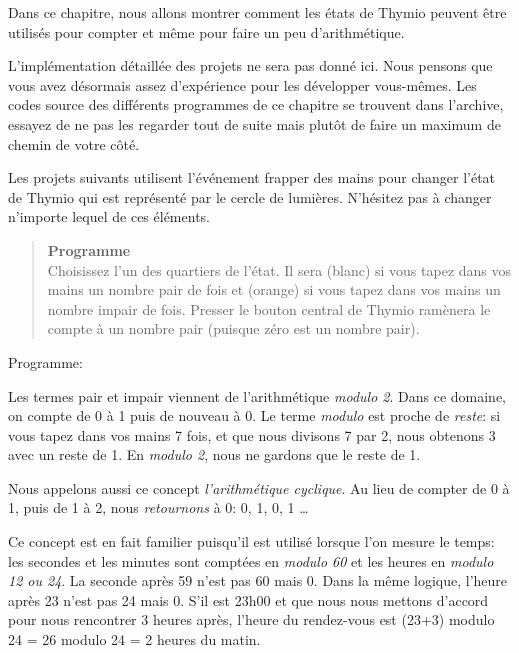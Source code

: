 \label{ch.counting}

Dans ce chapitre, nous allons montrer comment les états de Thymio peuvent être utilisés pour compter et même pour faire un peu d'arithmétique. 

L'implémentation détaillée des projets ne sera pas donné ici. Nous pensons que vous avez désormais assez d'expérience pour les développer vous-mêmes. Les codes source des différents programmes de ce chapitre se trouvent dans l'archive, essayez de ne pas les regarder tout de suite mais plutôt de faire un maximum de chemin de votre côté.

Les projets suivants utilisent l'événement frapper des mains  pour changer l'état de Thymio qui est représenté par le cercle de lumières.
N'hésitez pas à changer n'importe lequel de ces éléments.



\begin{quote}
\textbf{Programme}\\Choisissez l'un des quartiers de l'état.
Il sera  (blanc) si vous tapez dans vos mains un nombre pair de fois et  (orange) si vous tapez dans vos mains un nombre impair de fois.
Presser le bouton central de Thymio ramènera le compte à un nombre pair (puisque zéro est un nombre pair).
\end{quote}

{\raggedleft \hfill Programme: }

Les termes pair et impair viennent de l'arithmétique \emph{modulo 2}.
Dans ce domaine, on compte de 0 à 1 puis de nouveau à 0.
Le terme \emph{modulo} est proche de \emph{reste}:
si vous tapez dans vos mains 7 fois,
et que nous divisons 7 par 2,
nous obtenons 3 avec un reste de 1.
En \emph{modulo 2}, nous ne gardons que le reste de 1.

Nous appelons aussi ce concept \emph{l'arithmétique cyclique}. Au lieu de compter de 0 à 1, puis de 1 à 2, nous \emph{retournons} à 0: 0, 1, 0, 1 \ldots

Ce concept est en fait familier puisqu'il est utilisé
lorsque l'on mesure le temps:
les secondes et les minutes sont comptées en \emph{modulo 60}
et les heures en \emph{modulo 12 ou 24}.
La seconde après 59 n'est pas 60 mais 0.
Dans la même logique, l'heure après 23 n'est pas 24 mais 0.
S'il est 23h00 et que nous nous mettons d'accord pour nous rencontrer 3 heures après, l'heure du rendez-vous est (23+3) modulo 24 = 26 modulo 24 = 2 heures du matin.

